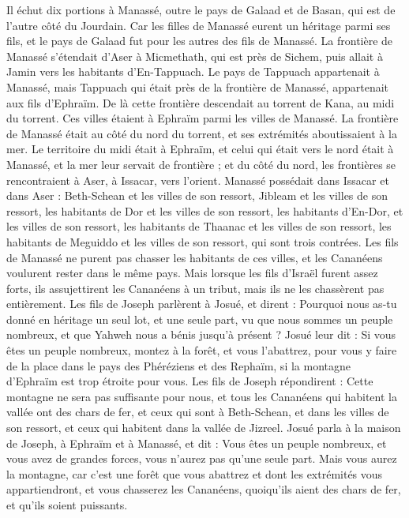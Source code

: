 \begin{multicols}{2}
Il échut dix portions à Manassé, outre le pays de Galaad et de Basan, qui est de l’autre côté du Jourdain.
Car les filles de Manassé eurent un héritage parmi ses fils, et le pays de Galaad fut pour les autres des fils de Manassé.
La frontière de Manassé s’étendait d’Aser à Micmethath, qui est près de Sichem, puis allait à Jamin vers les habitants d’En-Tappuach.
Le pays de Tappuach appartenait à Manassé, mais Tappuach qui était près de la frontière de Manassé, appartenait aux fils d’Ephraïm.
De là cette frontière descendait au torrent de Kana, au midi du torrent. Ces villes étaient à Ephraïm parmi les villes de Manassé. La frontière de Manassé était au côté du nord du torrent, et ses extrémités aboutissaient à la mer.
Le territoire du midi était à Ephraïm, et celui qui était vers le nord était à Manassé, et la mer leur servait de frontière ; et du côté du nord, les frontières se rencontraient à Aser, à Issacar, vers l’orient.
Manassé possédait dans Issacar et dans Aser : Beth-Schean et les villes de son ressort, Jibleam et les villes de son ressort, les habitants de Dor et les villes de son ressort, les habitants d’En-Dor, et les villes de son ressort, les habitants de Thaanac et les villes de son ressort, les habitants de Meguiddo et les villes de son ressort, qui sont trois contrées.
Les fils de Manassé ne purent pas chasser les habitants de ces villes, et les Cananéens voulurent rester dans le même pays.
Mais lorsque les fils d’Israël furent assez forts, ils assujettirent les Cananéens à un tribut, mais ils ne les chassèrent pas entièrement.
Les fils de Joseph parlèrent à Josué, et dirent : Pourquoi nous as-tu donné en héritage un seul lot, et une seule part, vu que nous sommes un peuple nombreux, et que Yahweh nous a bénis jusqu’à présent ?
Josué leur dit : Si vous êtes un peuple nombreux, montez à la forêt, et vous l’abattrez, pour vous y faire de la place dans le pays des Phéréziens et des Rephaïm, si la montagne d’Ephraïm est trop étroite pour vous.
Les fils de Joseph répondirent : Cette montagne ne sera pas suffisante pour nous, et tous les Cananéens qui habitent la vallée ont des chars de fer, et ceux qui sont à Beth-Schean, et dans les villes de son ressort, et ceux qui habitent dans la vallée de Jizreel.
Josué parla à la maison de Joseph, à Ephraïm et à Manassé, et dit : Vous êtes un peuple nombreux, et vous avez de grandes forces, vous n’aurez pas qu’une seule part.
Mais vous aurez la montagne, car c’est une forêt que vous abattrez et dont les extrémités vous appartiendront, et vous chasserez les Cananéens, quoiqu’ils aient des chars de fer, et qu’ils soient puissants.

\end{multicols}
